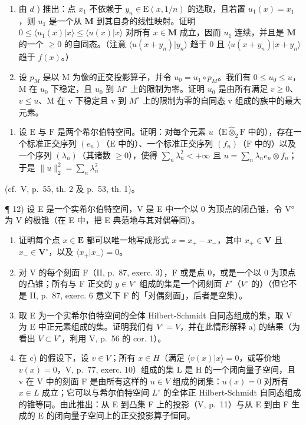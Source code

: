 \begin{enumerate}
\item
  由 \(d\) ) 推出：点 \(x_{1}\) 不依赖于 \(y_{n} \in \mathrm{E}(x, 1/n)\) 的选取，且若置 \(u_{1}(x) = x_{1}\)，则 \(u_{1}\) 是一个从 \(\mathbf{M}\) 到其自身的线性映射。证明 \(0 \leqslant \langle u_{1}(x)|x\rangle \leqslant \langle u(x)|x\rangle\) 对所有 \(x \in \mathbf{M}\) 成立，因而 \(u_{1}\) 连续，并且是 \(\mathbf{M}\) 的一个 \(\geqslant 0\) 的自同态。（注意 \(\langle u(x + y_n)|y_n\rangle\) 趋于 0 且 \(\langle u(x + y_n)|x + y_n\rangle\) 趋于 \(f(x)\)。）
\item
  设 \(p_{M}\) 是以 M 为像的正交投影算子，并令 \(u_{0} = u_{1} \circ p_{M}\)。我们有 \(0 \leqslant u_{0} \leqslant u\)，M 在 \(u_{0}\) 下稳定，且 \(u_{0}\) 到 \(M^{\circ}\) 上的限制为零。证明 \(u_{0}\) 是由所有满足 \(v \geqslant 0\)、\(v \leqslant u\)、M 在 v 下稳定且 v 到 \(M^{\circ}\) 上的限制为零的自同态 v 组成的族中的最大元素。
\end{enumerate}

\begin{enumerate}
\def\labelenumi{\arabic{enumi})}
\setcounter{enumi}{10}
\tightlist
\item
  设 \(\mathrm{E}\) 与 \(\mathrm{F}\) 是两个希尔伯特空间。证明：对每个元素 \(u\)（\(\mathrm{E} \hat{\otimes}_2 \mathrm{F}\) 中的），存在一个标准正交序列 \((e_n)\)（\(\mathrm{E}\) 中的）、一个标准正交序列 \((f_n)\)（\(\mathrm{F}\) 中的）以及一个序列 \((\lambda_n)\)（其诸数 \(\geqslant 0\)），使得 \(\sum_{n} \lambda_n^2 < +\infty\) 且 \(u = \sum_{n} \lambda_n e_n \otimes f_n\)；于是 \(\| u \|_2^2 = \sum_{n} \lambda_n^2\)
\end{enumerate}

(cf.~V, p.~55, th. 2 及 p.~53, th. 1)。

¶ 12) 设 E 是一个实希尔伯特空间，V 是 E 中一个以 0 为顶点的闭凸锥，令 V° 为 V 的极锥（在 E 中，把 E 典范地与其对偶等同）。

\begin{enumerate}
\def\labelenumi{\alph{enumi})}
\item
  证明每个点 \(x \in \mathbf{E}\) 都可以唯一地写成形式 \(x = x_{+} - x_{-}\)，其中 \(x_{+} \in \mathbf{V}\) 且 \(x_{-} \in \mathbf{V}^{\circ}\)，以及 \(\langle x_{+}|x_{-}\rangle = 0\)。
\item
  对 V 的每个刻面 F（II, p.~87, exerc. 3），F 或是点 0，或是一个以 0 为顶点的凸锥；所有与 F 正交的 \(y \in V^{\circ}\) 组成的集是一个闭刻面 \(F'\)（\(V^{\circ}\) 的）（但它不是 II, p.~87, exerc. 6 意义下 F 的「对偶刻面」，后者是空集）。
\item
  取 E 为一个实希尔伯特空间的全体 Hilbert-Schmidt 自同态组成的集，取 V 为 E 中正元素组成的集。证明我们有 \(V^{\circ} = V\)，并在此情形解释 a) 的结果（为看出 \(V \subset V^{\circ}\)，利用 V, p.~56 的 cor. 1）。
\item
  在 c) 的假设下，设 \(v \in V\)；所有 \(x \in H\)（满足 \(\langle v(x)|x \rangle = 0\)，或等价地 \(v(x) = 0\)，V, p.~77, exerc. 10）组成的集 L 是 H 的一个闭向量子空间，且 v 在 V 中的刻面 F 是由所有这样的 \(u \in V\) 组成的闭集：\(u(x) = 0\) 对所有 \(x \in L\) 成立；它可以与希尔伯特空间 \(L^{\circ}\) 的全体正 Hilbert-Schmidt 自同态组成的锥等同。由此推出：从 E 到凸集 F 上的投影（V, p.~11）与从 E 到由 F 生成的 E 的闭向量子空间上的正交投影算子恒同。
\end{enumerate}

